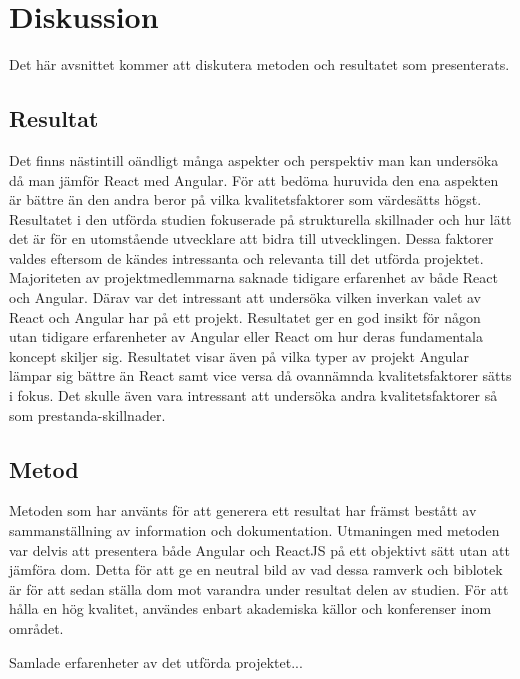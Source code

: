 \section{Diskussion}
\label{sec:axel-discussion}
Det här avsnittet kommer att diskutera metoden och resultatet som presenterats. 

\subsection{Resultat}
\label{subsec:axel-discussion-results}
Det finns nästintill oändligt många aspekter och perspektiv man kan undersöka då man jämför React med Angular. För att bedöma huruvida den ena aspekten är bättre än den andra beror på vilka kvalitetsfaktorer som värdesätts högst. Resultatet i den utförda studien fokuserade på strukturella skillnader och hur lätt det är för en utomstående utvecklare att bidra till utvecklingen. Dessa faktorer valdes eftersom de kändes intressanta och relevanta till det utförda projektet. Majoriteten av projektmedlemmarna saknade tidigare erfarenhet av både React och Angular. Därav var det intressant att undersöka vilken inverkan valet av React och Angular har på ett projekt. Resultatet ger en god insikt för någon utan tidigare erfarenheter av Angular eller React om hur deras fundamentala koncept skiljer sig. Resultatet visar även på vilka typer av projekt Angular lämpar sig bättre än React samt vice versa då ovannämnda kvalitetsfaktorer sätts i fokus. Det skulle även vara intressant att undersöka andra kvalitetsfaktorer så som prestanda-skillnader.

\subsection{Metod}
\label{subsec:axel-discussion-method}
Metoden som har använts för att generera ett resultat har främst bestått av sammanställning av information och dokumentation. Utmaningen med metoden var delvis att presentera både Angular och ReactJS på ett objektivt sätt utan att jämföra  dom. Detta för att ge en neutral bild av vad dessa ramverk och biblotek är för att sedan ställa dom mot varandra under resultat delen av studien. För att hålla en hög kvalitet, användes enbart akademiska källor och konferenser inom området.

Samlade erfarenheter av det utförda projektet...



